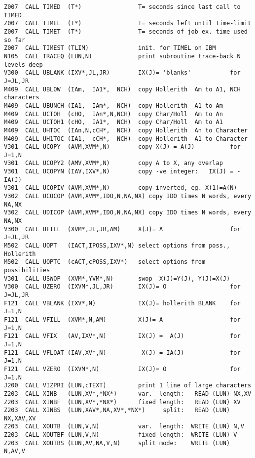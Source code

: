 \begin{verbatim}
Z007  CALL TIMED  (T*)                T= seconds since last call to TIMED
Z007  CALL TIMEL  (T*)                T= seconds left until time-limit
Z007  CALL TIMET  (T*)                T= seconds of job ex. time used so far
Z007  CALL TIMEST (TLIM)              init. for TIMEL on IBM
N105  CALL TRACEQ (LUN,N)             print subroutine trace-back N levels deep
V300  CALL UBLANK (IXV*,JL,JR)        IX(J)= 'blanks'           for J=JL,JR
M409  CALL UBLOW  (IAm,  IA1*,  NCH)  copy Hollerith  Am to A1, NCH characters
M409  CALL UBUNCH (IA1,  IAm*,  NCH)  copy Hollerith  A1 to Am
M409  CALL UCTOH  (cHO,  IAn*,N,NCH)  copy Char/Holl  Am to An
M409  CALL UCTOH1 (cHO,  IA1*,  NCH)  copy Char/Holl  Am to A1
M409  CALL UHTOC  (IAn,N,cCH*,  NCH)  copy Hollerith  An to Character
M409  CALL UH1TOC (IA1,  cCH*,  NCH)  copy Hollerith  A1 to Character
V301  CALL UCOPY  (AVM,XVM*,N)        copy X(J) = A(J)          for J=1,N
V301  CALL UCOPY2 (AMV,XVM*,N)        copy A to X, any overlap
V301  CALL UCOPYN (IAV,IXV*,N)        copy -ve integer:   IX(J) = -IA(J)
V301  CALL UCOPIV (AVM,XVM*,N)        copy inverted, eg. X(1)=A(N)
V302  CALL UCOCOP (AVM,XVM*,IDO,N,NA,NX) copy IDO times N words, every NA,NX
V302  CALL UDICOP (AVM,XVM*,IDO,N,NA,NX) copy IDO times N words, every NA,NX
V300  CALL UFILL  (XVM*,JL,JR,AM)     X(J)= A                   for J=JL,JR
M502  CALL UOPT   (IACT,IPOSS,IXV*,N) select options from poss., Hollerith
M502  CALL UOPTC  (cACT,cPOSS,IXV*)   select options from possibilities
V301  CALL USWOP  (XVM*,YVM*,N)       swop  X(J)=Y(J), Y(J)=X(J)
V300  CALL UZERO  (IXVM*,JL,JR)       IX(J)= O                  for J=JL,JR
F121  CALL VBLANK (IXV*,N)            IX(J)= hollerith BLANK    for J=1,N
F121  CALL VFILL  (XVM*,N,AM)         X(J)= A                   for J=1,N
F121  CALL VFIX   (AV,IXV*,N)         IX(J) =  A(J)             for J=1,N
F121  CALL VFLOAT (IAV,XV*,N)          X(J) = IA(J)             for J=1,N
F121  CALL VZERO  (IXVM*,N)           IX(J)= O                  for J=1,N
J200  CALL VIZPRI (LUN,cTEXT)         print 1 line of large characters
Z203  CALL XINB   (LUN,XV*,*NX*)      var.  length:   READ (LUN) NX,XV
Z203  CALL XINBF  (LUN,XV*,*NX*)      fixed length:   READ (LUN) XV
Z203  CALL XINBS  (LUN,XAV*,NA,XV*,*NX*)     split:   READ (LUN) NX,XAV,XV
Z203  CALL XOUTB  (LUN,V,N)           var.  length:  WRITE (LUN) N,V
Z203  CALL XOUTBF (LUN,V,N)           fixed length:  WRITE (LUN) V
Z203  CALL XOUTBS (LUN,AV,NA,V,N)     split mode:    WRITE (LUN) N,AV,V
\end{verbatim}

